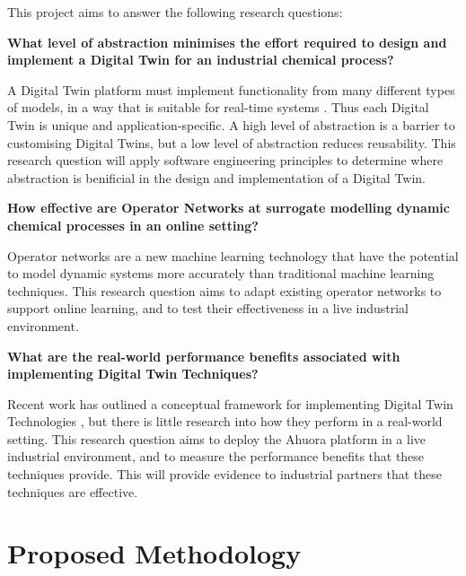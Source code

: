 \documentclass[12pt]{article}
\begin{document}
This project aims to answer the following research questions:

\textbf{What level of abstraction minimises the effort required to design and implement a Digital Twin for an industrial chemical process?}

 A Digital Twin platform must implement functionality from many different types of models, in a way that is suitable for real-time systems \cite{cao2021simulation}. Thus each Digital Twin is unique and application-specific. A high level of abstraction is a barrier to customising Digital Twins, but a low level of abstraction reduces reusability. This research question will apply software engineering principles to determine where abstraction is benificial in the design and implementation of a Digital Twin.


\textbf{How effective are Operator Networks at surrogate modelling dynamic chemical processes in an online setting?} %

Operator networks are a new machine learning technology that have the potential to model dynamic systems more accurately than traditional machine learning techniques. This research question aims to adapt existing operator networks to support online learning, and to test their effectiveness in a live industrial environment. 

\textbf{What are the real-world performance benefits associated with implementing Digital Twin Techniques?}

Recent work has outlined a conceptual framework for implementing Digital Twin Technologies \cite{ors2020conceptual}, but there is little research into how they perform in a real-world setting. This research question aims to deploy the Ahuora platform in a live industrial environment, and to measure the performance benefits that these techniques provide. This will provide evidence to industrial partners that these techniques are effective. 


\section*{Proposed Methodology}
\end{document}
